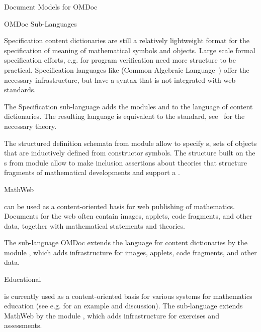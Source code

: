 \begin{module}[id=document-model]
\begin{omgroup}[id=document-model]{Document Models for OMDoc}
\begin{omgroup}[id=sub-languages]{OMDoc Sub-Languages}
\begin{module}[id=sub-languages]
\begin{omgroup}[id=sub-languages.spec]{Specification {\omdoc}}
{\omdoc} content dictionaries are still a relatively lightweight format for the
specification of meaning of mathematical symbols and objects. Large scale formal
specification efforts, e.g. for program verification need more structure to be
practical. Specification languages like {\casl} (Common Algebraic
 Language~\cite{CoFI:2004:CASL-RM}) offer the necessary
infrastructure, but have a syntax that is not integrated with web standards.

The Specification {\omdoc} sub-language adds the modules {} and
{} to the language of {\omdoc} content dictionaries. The resulting
language is equivalent to the {\casl} standard,
see~\cite{AutHut:tefsduc00,Hutter:mocsv00,MAH-06-a} for the necessary theory.

The structured definition schemata from module {} allow to specify
{s}, sets of objects that are inductively defined from
constructor symbols. The {} structure built on the
{s} from module {} allow to make inclusion
assertions about theories that structure fragments of mathematical developments and
support a .
\end{omgroup}

\begin{omgroup}[id=sub-languages.mathwebomdoc]{MathWeb {\omdoc}}

{\omdoc} can be used as a content-oriented basis for web publishing of
mathematics. Documents for the web often contain images, applets, code fragments,
and other data, together with mathematical statements and theories.

The {\omdoc} sub-language { {OMDoc}} extends the
language for {\omdoc} content dictionaries by the module {}, which adds
infrastructure for images, applets, code fragments, and other data.
\end{omgroup}

\begin{omgroup}[id=sub-languages.edu]{Educational {\omdoc}}

{\omdoc} is currently used as a content-oriented basis for various systems for mathematics
education (see e.g. {} for an example and discussion).  The {\omdoc}
sub-language  extends MathWeb {\omdoc}
by the module {}, which adds infrastructure for exercises and
assessments.
\end{omgroup}
\end{module}


\end{omgroup}
\end{omgroup}
\end{module}
